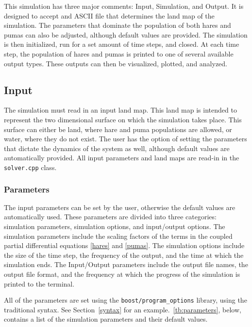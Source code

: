 \documentclass[a4paper,11pt]{article}
\begin{document}
{This simulation has three major comments: Input, Simulation, and Output.  It is designed to accept and ASCII file that determines the land map of the simulation.  The parameters that dominate the population of both hares and pumas can also be adjusted, although default values are provided.  The simulation is then initialized, run for a set amount of time steps, and closed.  At each time step, the population of hares and pumas is printed to one of several available output types.  These outputs can then be visualized, plotted, and analyzed.

\subsection{Input}

The simulation must read in an input land map.  This land map is intended to represent the two dimensional surface on which the simulation takes place.  This surface can either be land, where hare and puma populations are allowed, or water, where they do not exist.  The user has the option of setting the parameters that dictate the dynamics of the system as well, although default values are automatically provided.  All input parameters and land maps are read-in in the \texttt{solver.cpp} class.

\subsubsection{Parameters}\label{params}

The input parameters can be set by the user, otherwise the default values are automatically used.  These parameters are divided into three categories: simulation parameters, simulation options, and input/output options.  The simulation parameters include the scaling factors of the terms in the coupled partial differential equations \eqref{hares} and \eqref{pumas}.  The simulation options include the size of the time step, the frequency of the output, and the time at which the simulation ends.  The Input/Output parameters include the output file names, the output file format, and the frequency at which the progress of the simulation is printed to the terminal.  

All of the parameters are set using the \texttt{boost/program\_options} library, using the traditional syntax.  See Section~\ref{syntax} for an example.~\ref{tb:parameters}, below, contains a list of the simulation parameters and their default values.

}
\end{document}
